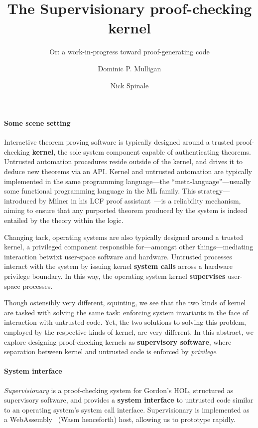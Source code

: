 \documentclass[sigplan, review]{acmart}
\title{The Supervisionary proof-checking kernel}
\subtitle{Or: a work-in-progress toward proof-generating code}
\author{Dominic P. Mulligan}
\affiliation{
  \institution{Systems Research Group, Arm Research}
  \streetaddress{Fulbourn Road}
  \city{Cambridge}
  \country{United Kingdom}
}
\author{Nick Spinale}
\affiliation{
  \institution{Systems Research Group, Arm Research}
  \streetaddress{Fulbourn Road}
  \city{Cambridge}
  \country{United Kingdom}
}
\newcommand{\deffont}[1]{\textbf{#1}}
\begin{document}
\maketitle

\paragraph{Some scene setting}

Interactive theorem proving software is typically designed around a trusted proof-checking \deffont{kernel}, the sole system component capable of authenticating theorems.
Untrusted automation procedures reside outside of the kernel, and drives it to deduce new theorems via an API.
Kernel and untrusted automation are typically implemented in the same programming language---the ``meta-language''---usually some functional programming language in the ML family.
This strategy---introduced by Milner in his LCF proof assistant~\cite{Milner1972LogicFC}---is a reliability mechanism, aiming to ensure that any purported theorem produced by the system is indeed entailed by the theory within the logic.

Changing tack, operating systems are also typically designed around a trusted kernel, a privileged component responsible for---amongst other things---mediating interaction betwixt user-space software and hardware.
Untrusted processes interact with the system by issuing kernel \deffont{system calls} across a hardware privilege boundary.
In this way, the operating system kernel \deffont{supervises} user-space processes.

Though ostensibly very different, squinting, we see that the two kinds of kernel are tasked with solving the same task: enforcing system invariants in the face of interaction with untrusted code.
Yet, the two solutions to solving this problem, employed by the respective kinds of kernel, are very different.
In this abstract, we explore designing proof-checking kernels as \deffont{supervisory software}, where separation between kernel and untrusted code is enforced by \emph{privilege}.

\paragraph{System interface}

\emph{Supervisionary} is a proof-checking system for Gordon's HOL, structured as supervisory software, and provides a \deffont{system interface} to untrusted code similar to an operating system's system call interface.
Supervisionary is implemented as a WebAssembly~\cite{DBLP:conf/pldi/HaasRSTHGWZB17} (Wasm henceforth) host, allowing us to prototype rapidly.
\end{document}
